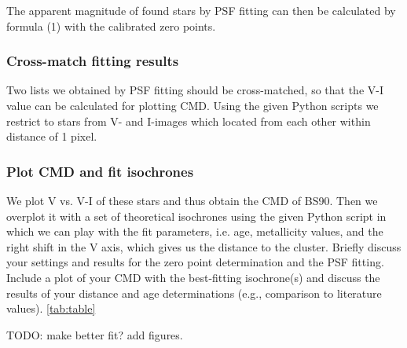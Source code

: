 The apparent magnitude of found stars by PSF fitting can then be calculated by formula (1) with the calibrated zero points.

\subsubsection{Cross-match fitting results}
Two lists we obtained by PSF fitting should be cross-matched, so that the V-I value can be calculated for plotting CMD. Using the given Python scripts we restrict to stars from V- and I-images which located from each other within distance of 1 pixel. 

\subsubsection{Plot CMD and fit isochrones}
We plot V vs. V-I of these stars and thus obtain the CMD of BS90. Then we overplot it with a set of theoretical isochrones using the given Python script in which we can play with the fit parameters, i.e. age, metallicity values, and the right shift in the V axis, which gives us the distance to the cluster.
Briefly discuss your settings and results for the zero point determination and the PSF fitting.
Include a plot of your CMD with the best-fitting isochrone(s) and discuss the results of your distance and age determinations (e.g., comparison to literature values). \ref{tab:table}

TODO: make better fit? add figures.
